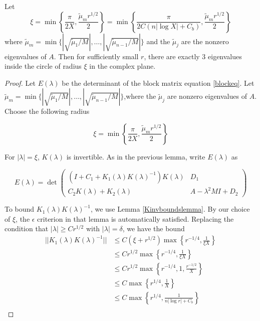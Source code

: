 \documentclass[thesis.tex]{subfiles}
\begin{document}
\begin{lemma}\label{eigcount2}
Let 
\begin{equation}
\xi = \min\left\{ \frac{\pi}{2X}, \frac{\tilde{\mu}_m r^{1/2}}{2} \right\} = 
\min\left\{ \frac{\pi}{2 C( n |\log X| + C_b)}, \frac{\tilde{\mu}_m r^{1/2}}{2} \right\} 
\end{equation}
where $\tilde{\mu}_m = \min \{ |\sqrt{\tilde{\mu}_1/M}|, \dots, |\sqrt{\tilde{\mu}_{n-1}/M}| \}$ and the $\tilde{\mu}_j$ are the nonzero eigenvalues of $A$. Then for sufficiently small $r$, there are exactly 3 eigenvalues inside the circle of radius $\xi$ in the complex plane.

\begin{proof}
Let $E(\lambda)$ be the determinant of the block matrix equation \ref{blockeq}. Let $\tilde{\mu}_m = \min \{ |\sqrt{\tilde{\mu}_1/M}|, \dots, |\sqrt{\tilde{\mu}_{n-1}/M}| \}$,where the $\tilde{\mu}_j$ are nonzero eigenvalues of $A$. Choose the following radius

\[
\xi = \min\left\{ \frac{\pi}{2X}, \frac{\tilde{\mu}_m r^{1/2}}{2} \right\}
\]

For $|\lambda| = \xi$, $K(\lambda)$ is invertible. As in the previous lemma, write $E(\lambda)$ as

\begin{equation*}
E(\lambda) = \det 
\begin{pmatrix}
(I + C_1 + K_1(\lambda)K(\lambda)^{-1})K(\lambda) & D_1 \\
C_2 K(\lambda) + K_2(\lambda) & A - \lambda^2 MI + D_2
\end{pmatrix}
\end{equation*}

To bound $K_1(\lambda)K(\lambda)^{-1}$, we use Lemma \ref{Kinvboundslemma}. By our choice of $\xi$, the $\epsilon$ criterion in that lemma is automatically satisfied. Replacing the condition that $|\lambda| \geq C r^{1/2}$ with $|\lambda| = \delta$, we have the bound
\begin{align*}
||K_1(\lambda)K(\lambda)^{-1}|| &\leq C( \xi + r^{1/2})\max\left\{ r^{-1/4}, \frac{1}{\xi X} \right\} \\
&\leq C r^{1/2} \max\left\{ r^{-1/4}, \frac{1}{\xi X} \right\} \\
&\leq C r^{1/2} \max\left\{ r^{-1/4}, 1, \frac{r^{-1/2}}{X} \right\} \\
&\leq C \max\left\{ r^{1/4}, \frac{1}{X} \right\} \\
&\leq C \max\left\{ r^{1/4}, \frac{1}{n|\log r| + C_b } \right\} \\
\end{align*}


\end{proof}
\end{lemma}
\end{document}
